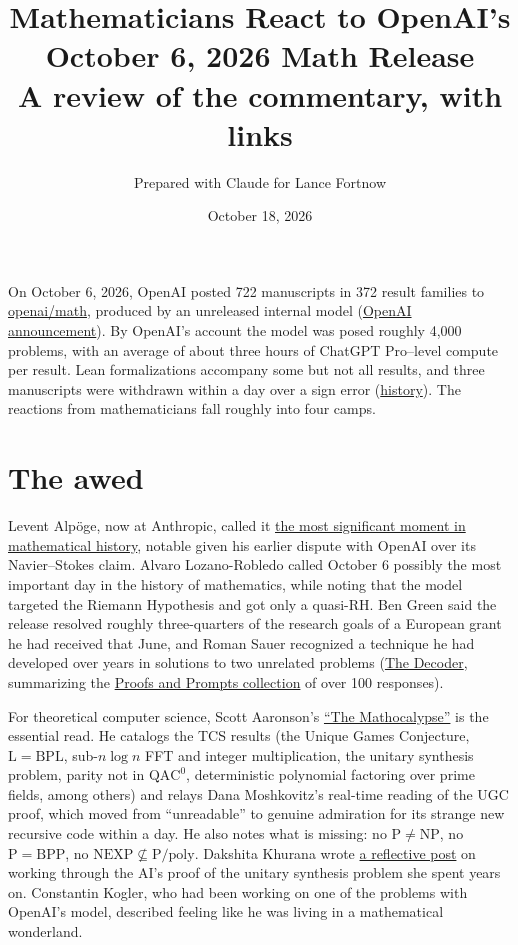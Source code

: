 \documentclass[11pt]{article}
\title{Mathematicians React to OpenAI's October 6, 2026 Math Release\\[4pt]
\large A review of the commentary, with links}
\author{Prepared with Claude for Lance Fortnow}
\date{October 18, 2026}
\newcommand{\cls}[1]{\mathrm{#1}}
\begin{document}
\maketitle

On October 6, 2026, OpenAI posted 722 manuscripts in 372 result families to
\href{https://github.com/openai/math}{openai/math}, produced by an unreleased
internal model
(\href{https://openai.com/index/sharing-ai-progress-in-mathematics/}{OpenAI announcement}).
By OpenAI's account the model was posed roughly 4,000 problems, with an average
of about three hours of ChatGPT Pro--level compute per result. Lean
formalizations accompany some but not all results, and three manuscripts were
withdrawn within a day over a sign error
(\href{https://github.com/openai/math/blob/main/history.md}{history}). The
reactions from mathematicians fall roughly into four camps.

\section*{The awed}

Levent Alp\"oge, now at Anthropic, called it
\href{https://x.com/__alpoge__/status/2107616859595981117}{the most significant moment in mathematical history},
notable given his earlier dispute with OpenAI over its Navier--Stokes claim.
Alvaro Lozano-Robledo called October 6 possibly the most important day in the
history of mathematics, while noting that the model targeted the Riemann
Hypothesis and got only a quasi-RH. Ben Green said the release resolved roughly
three-quarters of the research goals of a European grant he had received that
June, and Roman Sauer recognized a technique he had developed over years in
solutions to two unrelated problems
(\href{https://the-decoder.com/how-much-beauty-have-we-lost-mathematicians-react-with-shock-and-disgust-as-openai-bulldozes-their-field/}{The Decoder},
summarizing the
\href{https://proofsandprompts.com/2026/10/08/100-reactions-to-100-solutions/}{Proofs and Prompts collection}
of over 100 responses).

For theoretical computer science, Scott Aaronson's
\href{https://scottaaronson.blog/?p=10169}{``The Mathocalypse''} is the
essential read. He catalogs the TCS results (the Unique Games Conjecture,
$\cls{L}=\cls{BPL}$, sub-$n\log n$ FFT and integer multiplication, the unitary
synthesis problem, parity not in $\cls{QAC}^0$, deterministic polynomial
factoring over prime fields, among others) and relays Dana Moshkovitz's
real-time reading of the UGC proof, which moved from ``unreadable'' to genuine
admiration for its strange new recursive code within a day. He also notes what
is missing: no $\cls{P}\neq\cls{NP}$, no $\cls{P}=\cls{BPP}$, no
$\cls{NEXP}\not\subseteq\cls{P/poly}$. Dakshita Khurana wrote
\href{https://dakshitakhurana.substack.com/p/classical-at-heart}{a reflective post}
on working through the AI's proof of the unitary synthesis problem she spent
years on. Constantin Kogler, who had been working on one of the problems with
OpenAI's model, described feeling like he was living in a mathematical
wonderland.
\end{document}

